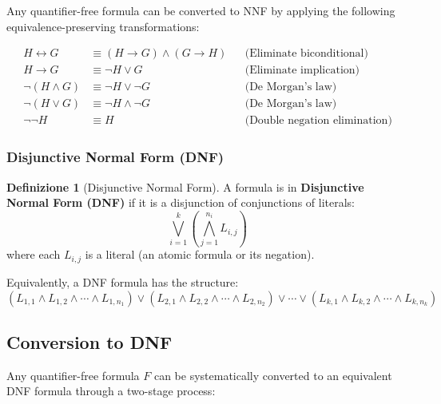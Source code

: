 \documentclass[11pt,a4paper]{article}
\theoremstyle{definition}
\newtheorem{definition}{Definizione}[section]
\theoremstyle{plain}
\theoremstyle{remark}
\begin{document}
Any quantifier-free formula can be converted to NNF by applying the following equivalence-preserving transformations:

\begin{align*}
H \leftrightarrow G &\equiv (H \rightarrow G) \wedge (G \rightarrow H) && \text{(Eliminate biconditional)} \\
H \rightarrow G &\equiv \neg H \vee G && \text{(Eliminate implication)} \\
\neg (H \wedge G) &\equiv \neg H \vee \neg G && \text{(De Morgan's law)} \\
\neg (H \vee G) &\equiv \neg H \wedge \neg G && \text{(De Morgan's law)} \\
\neg \neg H &\equiv H && \text{(Double negation elimination)}
\end{align*}

\subsubsection{Disjunctive Normal Form (DNF)}

\begin{definition}[Disjunctive Normal Form]
A formula is in \textbf{Disjunctive Normal Form (DNF)} if it is a disjunction of conjunctions of literals:
\[
\bigvee_{i=1}^{k} \left( \bigwedge_{j=1}^{n_i} L_{i,j} \right)
\]
where each $L_{i,j}$ is a literal (an atomic formula or its negation).
\end{definition}

Equivalently, a DNF formula has the structure:
\[
(L_{1,1} \wedge L_{1,2} \wedge \cdots \wedge L_{1,n_1}) \vee (L_{2,1} \wedge L_{2,2} \wedge \cdots \wedge L_{2,n_2}) \vee \cdots \vee (L_{k,1} \wedge L_{k,2} \wedge \cdots \wedge L_{k,n_k})
\]

\subsection{Conversion to DNF}

Any quantifier-free formula $F$ can be systematically converted to an equivalent DNF formula through a two-stage process:

\begin{center}
\end{center}
\end{document}
